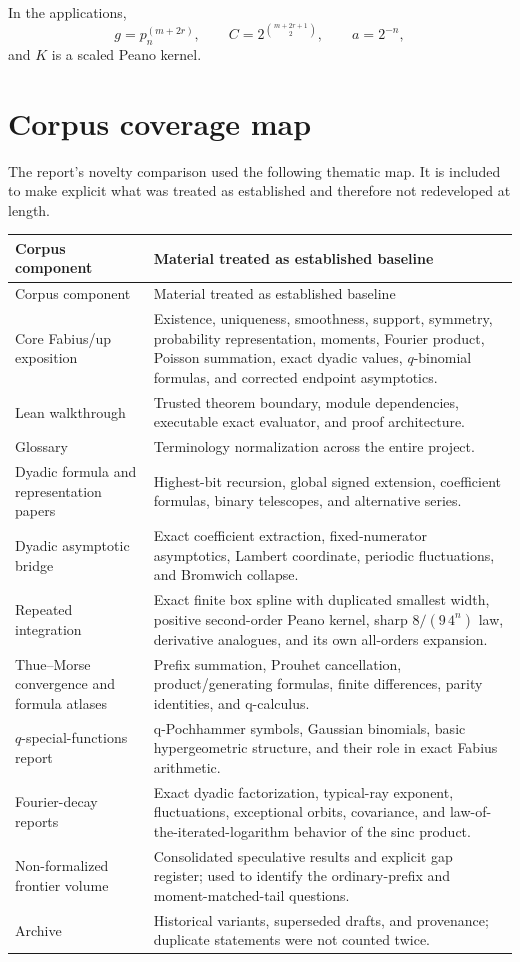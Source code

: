 \documentclass[11pt]{article}
\numberwithin{equation}{section}
\theoremstyle{definition}
\theoremstyle{remark}
\begin{document}
In the applications,
\[
 g=p_n^{(m+2r)},
 \qquad
 C=2^{\binom{m+2r+1}{2}},
 \qquad
 a=2^{-n},
\]
and $K$ is a scaled Peano kernel.

\section{Corpus coverage map}
\label{p1:app:coverage}

The report's novelty comparison used the following thematic map.  It is included to make explicit what was treated as established and therefore not redeveloped at length.

\begin{longtable}{@{}p{}p{}@{}}
\toprule
Corpus component & Material treated as established baseline\\
\midrule
\endfirsthead
\toprule
Corpus component & Material treated as established baseline\\
\midrule
\endhead
Core Fabius/up exposition & Existence, uniqueness, smoothness, support, symmetry, probability representation, moments, Fourier product, Poisson summation, exact dyadic values, $q$-binomial formulas, and corrected endpoint asymptotics.\\
Lean walkthrough & Trusted theorem boundary, module dependencies, executable exact evaluator, and proof architecture.\\
Glossary & Terminology normalization across the entire project.\\
Dyadic formula and representation papers & Highest-bit recursion, global signed extension, coefficient formulas, binary telescopes, and alternative series.\\
Dyadic asymptotic bridge & Exact coefficient extraction, fixed-numerator asymptotics, Lambert coordinate, periodic fluctuations, and Bromwich collapse.\\
Repeated integration & Exact finite box spline with duplicated smallest width, positive second-order Peano kernel, sharp $8/(9\,4^n)$ law, derivative analogues, and its own all-orders expansion.\\
Thue--Morse convergence and formula atlases & Prefix summation, Prouhet cancellation, product/generating formulas, finite differences, parity identities, and q-calculus.\\
$q$-special-functions report & q-Pochhammer symbols, Gaussian binomials, basic hypergeometric structure, and their role in exact Fabius arithmetic.\\
Fourier-decay reports & Exact dyadic factorization, typical-ray exponent, fluctuations, exceptional orbits, covariance, and law-of-the-iterated-logarithm behavior of the sinc product.\\
Non-formalized frontier volume & Consolidated speculative results and explicit gap register; used to identify the ordinary-prefix and moment-matched-tail questions.\\
Archive & Historical variants, superseded drafts, and provenance; duplicate statements were not counted twice.\\
\bottomrule
\end{longtable}
\end{document}
